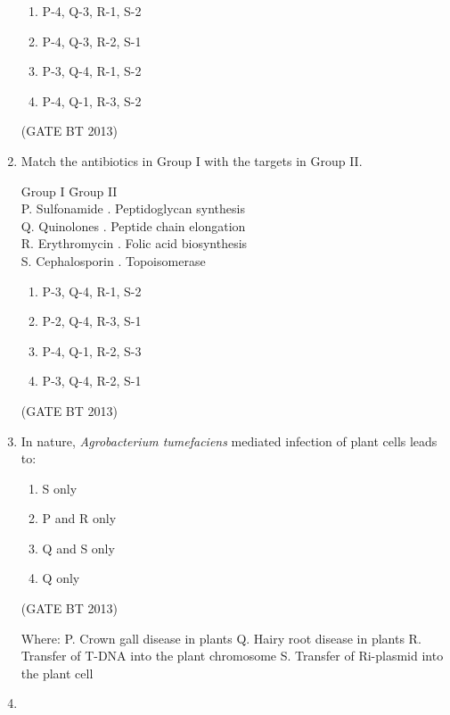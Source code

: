 \documentclass[journal,12pt,onecolumn]{IEEEtran}
\theoremstyle{remark}
\begin{document}
\begin{enumerate}
\begin{enumerate}[label=(\Alph*)]
    \item P-4, Q-3, R-1, S-2
    \item P-4, Q-3, R-2, S-1
    \item P-3, Q-4, R-1, S-2
    \item P-4, Q-1, R-3, S-2
\end{enumerate} 
\hfill (GATE BT 2013)
\item 

Match the antibiotics in Group I with the targets in Group II.

\begin{tabbing}
Group I \hspace{3.5cm} \= Group II \\
P. Sulfonamide . Peptidoglycan synthesis \\
Q. Quinolones . Peptide chain elongation \\
R. Erythromycin . Folic acid biosynthesis \\
S. Cephalosporin . Topoisomerase \\
\end{tabbing}

\begin{enumerate}[label=(\Alph*)]
    \item P-3, Q-4, R-1, S-2
    \item P-2, Q-4, R-3, S-1
    \item P-4, Q-1, R-2, S-3
    \item P-3, Q-4, R-2, S-1
\end{enumerate} \hfill(GATE BT 2013)

\item 

In nature, \textit{Agrobacterium tumefaciens} mediated infection of plant cells leads to:

\begin{enumerate}[label=\Alph*.]
    \item S only
    \item P and R only
    \item Q and S only
    \item Q only
\end{enumerate} \hfill(GATE BT 2013)

Where:  
P. Crown gall disease in plants  
Q. Hairy root disease in plants  
R. Transfer of T-DNA into the plant chromosome  
S. Transfer of Ri-plasmid into the plant cell
\item 


\end{enumerate}
\end{document}
